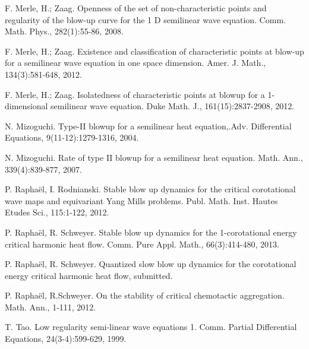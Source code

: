 \documentclass[11pt,a4paper,reqno]{amsart}
\theoremstyle{remark}
\numberwithin{equation}{section}
\begin{document}
\begin{thebibliography}{99}
  F. Merle, H.; Zaag. Openness of the set of non-characteristic points and regularity of the blow-up curve for the 1 D semilinear wave equation. Comm. Math. Phys., 282(1):55-86, 2008.

  F. Merle, H.; Zaag. Existence and classification of characteristic points at blow-up for a semilinear wave equation in one space dimension. Amer. J. Math., 134(3):581-648, 2012.

  F. Merle, H.; Zaag. Isolatedness of characteristic points at blowup for a 1-dimensional semilinear wave equation. Duke Math. J., 161(15):2837-2908, 2012.
 
 N. Mizoguchi. Type-II blowup for a semilinear heat equation,.Adv. Differential Equations, 9(11-12):1279-1316, 2004. 

  N. Mizoguchi. Rate of type II blowup for a semilinear heat equation. Math. Ann., 339(4):839-877, 2007. 

 P. Rapha\"el, I. Rodnianski. Stable blow up dynamics for the critical corotational wave maps and equivariant Yang Mills problems. Publ. Math. Inst. Hautes Etudes Sci., 115:1-122, 2012.
    
   P. Rapha\"el, R. Schweyer. Stable blow up dynamics for the 1-corotational energy critical harmonic heat flow. Comm. Pure Appl. Math., 66(3):414-480, 2013.
  
   P. Rapha\"el, R. Schweyer. Quantized slow blow up dynamics for the corotational energy critical harmonic heat flow, submitted.

 P. Rapha\"el, R.Schweyer. On the stability of critical chemotactic aggregation. Math. Ann., 1-111, 2012.
  
 T. Tao. Low regularity semi-linear wave equations 1. Comm. Partial Differential Equations, 24(3-4):599-629, 1999.

  
\end{thebibliography}
\end{document}
